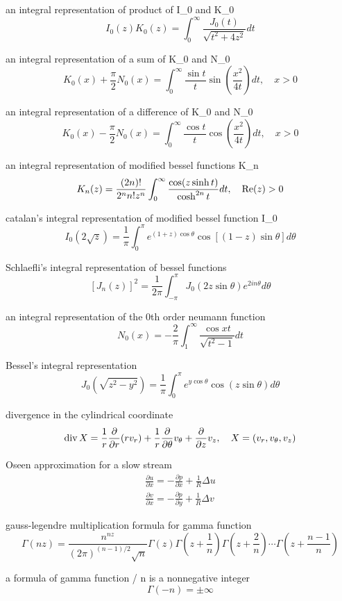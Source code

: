 an integral representation of product of I_0 and K_0
$$
I_0(z)K_0(z)=\int^\infty_0 \frac{J_0(t)}{\sqrt{t^2+4z^2}}dt
$$

an integral representation of a sum of K_0 and N_0
$$
K_0(x)+\frac{\pi}{2}N_0(x)=\int^\infty_0\frac{\sin t}{t}\sin\left(\frac{x^2}{4t}\right)dt, \quad x>0
$$

an integral representation of a difference of K_0 and N_0
$$
K_0(x)-\frac{\pi}{2}N_0(x)=\int^\infty_0\frac{\cos t}{t}\cos\left(\frac{x^2}{4t}\right)dt, \quad x>0
$$

an integral representation of modified bessel functions K_n
$$
K_n(z)=\frac{(2n)!}{2^n n! z^n}\int^\infty_0\frac{\cos(z\sinh t)}{\cosh^{2n} t}dt, \quad {\rm Re}(z)>0
$$

catalan’s integral representation of modified bessel function I_0
$$
I_0(2\sqrt{z})=\frac{1}{\pi}\int^\pi_0 e^{(1+z)\cos\theta}\cos[(1-z)\sin\theta]d\theta
$$

Schlaefli’s integral representation of bessel functions
$$
\left[J_n(z)\right]^2=\frac{1}{2\pi}\int^\pi_{-\pi} J_0(2z\sin\theta) e^{2 i n\theta} d\theta
$$

an integral representation of the 0th order neumann function
$$
N_0(x)=-\frac{2}{\pi}\int^\infty_1 \frac{\cos xt}{\sqrt{t^2-1}}dt
$$

Bessel’s integral representation
$$
J_0(\sqrt{z^2-y^2})=\frac{1}{\pi}\int^\pi_0 e^{y \cos\theta}\cos(z \sin\theta)d\theta
$$

divergence in the cylindrical coordinate
\begin{equation}
{\rm div}\,  X = \frac{1}{r}\frac{\partial}{\partial r}(r v_r)+\frac{1}{r}\frac{\partial}{\partial \theta}v_\theta+\frac{\partial}{\partial z}v_z, \quad X=(v_r,v_\theta,v_z) \nonumber
\end{equation}

Oseen approximation for a slow stream
\begin{eqnarray}
\frac{\partial u}{\partial x}=-\frac{\partial p}{\partial x}+\frac{1}{R}\Delta u  \nonumber \\
\frac{\partial v}{\partial x}=-\frac{\partial p}{\partial y}+\frac{1}{R}\Delta v
\nonumber
\end{eqnarray}

gauss-legendre multiplication formula for gamma function
$$
\Gamma(nz)=\frac{n^{nz}}{(2\pi)^{(n-1)/2}\sqrt{n}}\Gamma(z)\Gamma\left(z+\frac{1}{n}\right)\Gamma\left(z+\frac{2}{n}\right)\cdots\Gamma\left(z+\frac{n-1}{n}\right)
$$

a formula of gamma function / n is a nonnegative integer
$$
\Gamma(-n)=\pm \infty
$$


